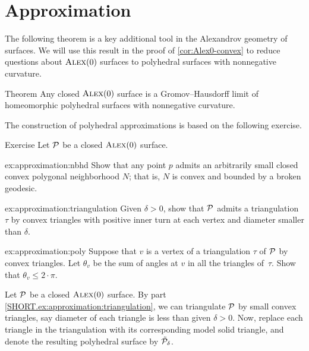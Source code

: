 \section{Approximation}

The following theorem is a key additional tool in the Alexandrov geometry of surfaces.
We will use this result in the proof of \ref{cor:Alex0-convex} to reduce questions about $\textsc{Alex}(0)$ surfaces to polyhedral surfaces with nonnegative curvature.


\begin{thm}{Theorem}\label{thm:approximation}
Any closed $\textsc{Alex}(0)$ surface is a Gromov--Hausdorff limit of homeomorphic polyhedral surfaces with nonnegative curvature.
\end{thm}

The construction of polyhedral approximations is based on the following exercise.

\begin{thm}{Exercise}\label{ex:construction}
Let $\mathcal{P}$ be a closed $\textsc{Alex}(0)$ surface.

\begin{subthm}{ex:approximation:nbhd}
Show that any point $p$ admits an arbitrarily small closed convex polygonal neighborhood $N$;
that is, $N$ is convex and bounded by a broken geodesic.

\end{subthm}

\begin{subthm}{ex:approximation:triangulation}
Given $\delta>0$, show that $\mathcal{P}$ admits a triangulation $\tau$ by convex triangles
with positive inner turn at each vertex and diameter smaller than $\delta$.
\end{subthm}

\begin{subthm}{ex:approximation:poly}
Suppose that $v$ is a vertex of a triangulation $\tau$ of $\mathcal{P}$ by convex triangles.
Let $\theta_v$ be the sum of angles at $v$ in all the triangles of~$\tau$.
Show that $\theta_v\le 2\cdot\pi$.
\end{subthm}

\end{thm}

Let $\mathcal{P}$ be a closed $\textsc{Alex}(0)$ surface.
By part \ref{SHORT.ex:approximation:triangulation}, we can triangulate $\mathcal{P}$ by small convex triangles, say diameter of each triangle is less than given $\delta>0$.
Now, replace each triangle in the triangulation with its corresponding model solid triangle, and denote the resulting polyhedral surface by $\tilde{\mathcal{P}}_\delta$.

